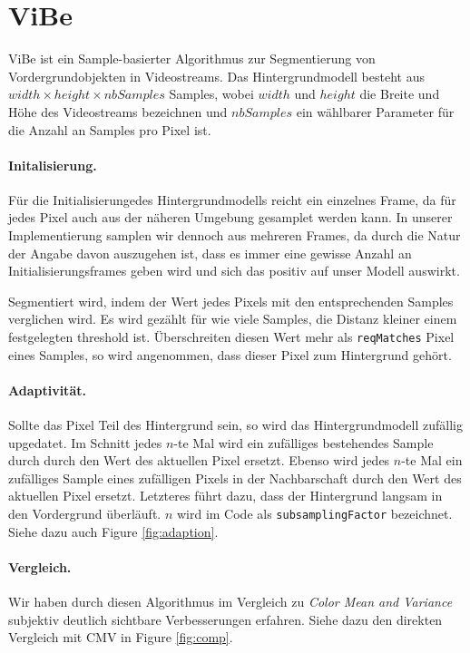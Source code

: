 \documentclass[]{scrartcl}
\begin{document}
\section{ViBe}\label{sec:vibe}
ViBe ist ein Sample-basierter Algorithmus zur Segmentierung von Vordergrundobjekten in Videostreams. Das Hintergrundmodell besteht aus $width \times height \times nbSamples$ Samples, wobei $width$ und $height$ die Breite und H\"ohe des Videostreams bezeichnen und $nbSamples$ ein w\"ahlbarer Parameter f\"ur die Anzahl an Samples pro Pixel ist. 

\paragraph{Initalisierung.}
F\"ur die Initialisierungedes Hintergrundmodells reicht ein einzelnes Frame, da f\"ur jedes Pixel auch aus der n\"aheren Umgebung gesamplet werden kann. In unserer Implementierung samplen wir dennoch aus mehreren Frames, da durch die Natur der Angabe davon auszugehen ist, dass es immer eine gewisse Anzahl an Initialisierungsframes geben wird und sich das positiv auf unser Modell auswirkt.

Segmentiert wird, indem der Wert jedes Pixels mit den entsprechenden Samples verglichen wird. Es wird gez\"ahlt f\"ur wie viele Samples, die Distanz kleiner einem festgelegten threshold ist. \"Uberschreiten diesen Wert mehr als \texttt{reqMatches} Pixel eines Samples, so wird angenommen, dass dieser Pixel zum Hintergrund geh\"ort.

\paragraph{Adaptivit\"at.}
Sollte das Pixel Teil des Hintergrund sein, so wird das Hintergrundmodell zuf\"allig upgedatet. Im Schnitt jedes $n$-te Mal wird ein zuf\"alliges bestehendes Sample durch durch den Wert des aktuellen Pixel ersetzt. Ebenso wird jedes $n$-te Mal ein zuf\"alliges Sample eines zuf\"alligen Pixels in der Nachbarschaft durch den Wert des aktuellen Pixel ersetzt. Letzteres f\"uhrt dazu, dass der Hintergrund langsam in den Vordergrund \"uberl\"auft. $n$ wird im Code als \texttt{subsamplingFactor} bezeichnet. Siehe dazu auch Figure \ref{fig:adaption}.

\paragraph{Vergleich.}
Wir haben durch diesen Algorithmus im Vergleich zu \textit{Color Mean and Variance} subjektiv deutlich sichtbare Verbesserungen erfahren. Siehe dazu den direkten Vergleich mit CMV in Figure \ref{fig:comp}. 
\end{document}
